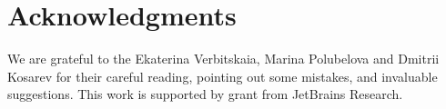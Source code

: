\section*{Acknowledgments}

We are grateful to the Ekaterina Verbitskaia, Marina Polubelova and Dmitrii Kosarev for their careful reading, pointing out some mistakes, and invaluable suggestions.
This work is supported by grant from JetBrains Research.